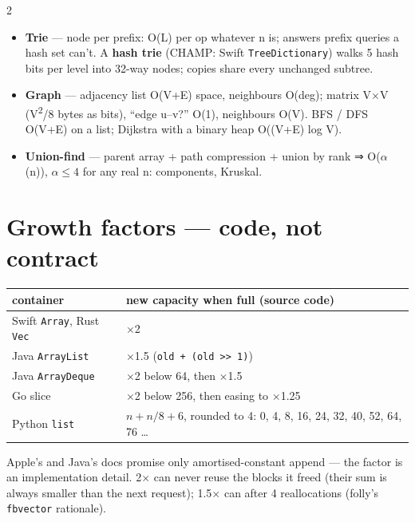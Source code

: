 \documentclass[8pt]{extarticle}
\newcommand\ct[1]{\texttt{#1}}
\begin{document}
\begin{multicols}{2}
\begin{itemize}
  \item \textbf{Trie} — node per prefix: O(L) per op whatever n is; answers prefix
        queries a hash set can't. A \textbf{hash trie} (CHAMP: Swift
        \ct{TreeDictionary}) walks 5 hash bits per level into 32-way nodes; copies
        share every unchanged subtree.
  \item \textbf{Graph} — adjacency list O(V+E) space, neighbours O(deg); matrix
        V$\times$V (V\textsuperscript{2}/8 bytes as bits), ``edge u–v?'' O(1),
        neighbours O(V). BFS / DFS O(V+E) on a list; Dijkstra with a binary heap
        O((V+E) log V).
  \item \textbf{Union-find} — parent array + path compression + union by rank ⇒
        O($\alpha$(n)), $\alpha \le 4$ for any real n: components, Kruskal.
\end{itemize}

\section{Growth factors — code, not contract}
{\scriptsize\setlength{\tabcolsep}{2pt}
\begin{tabular}{@{}>{\raggedright\arraybackslash}p{22mm}>{\raggedright\arraybackslash}p{54mm}@{}}
\toprule
\textbf{container} & \textbf{new capacity when full (source code)}\\
\midrule
Swift \ct{Array}, Rust \ct{Vec} & $\times$2\\
Java \ct{ArrayList} & $\times$1.5 (\ct{old + (old >> 1)})\\
Java \ct{ArrayDeque} & $\times$2 below 64, then $\times$1.5\\
Go slice & $\times$2 below 256, then easing to $\times$1.25\\
Python \ct{list} & $n + n/8 + 6$, rounded to 4: 0, 4, 8, 16, 24, 32, 40, 52, 64, 76 …\\
\bottomrule
\end{tabular}}\par
Apple's and Java's docs promise only amortised-constant append — the factor is
an implementation detail. 2$\times$ can never reuse the blocks it freed (their
sum is always smaller than the next request); 1.5$\times$ can after 4
reallocations (folly's \ct{fbvector} rationale).


\end{multicols}
\end{document}
